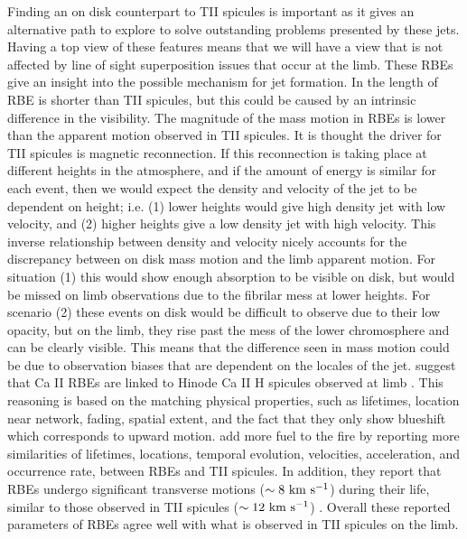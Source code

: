 Finding an on disk counterpart to TII spicules is important as it gives an alternative path to explore to solve outstanding problems presented by these jets. Having a top view of these features means that we will have a view that is not affected by line of sight superposition issues that occur at the limb. These RBEs give an insight into the possible mechanism for jet formation. In \cite{Langangen2008ApJ} the length of RBE is shorter than TII spicules, but this could be caused by an intrinsic difference in the visibility. The magnitude of the mass motion in RBEs is lower than the apparent motion observed in TII spicules. It is thought the driver for TII spicules is magnetic reconnection. If this reconnection is taking place at different heights in the atmosphere, and if the amount of energy is similar for each event, then we would expect the density and velocity of the jet to be dependent on height; i.e. (1) lower heights would give high density jet with low velocity, and (2) higher heights give a low density jet with high velocity. This inverse relationship between density and velocity nicely accounts for the discrepancy between on disk mass motion and the limb apparent motion. For situation (1) this would show enough absorption to be visible on disk, but would be missed on limb observations due to the fibrilar mess at lower heights. For scenario (2) these events on disk would be difficult to observe due to their low opacity, but on the limb, they rise past the mess of the lower chromosphere and can be clearly visible. This means that the difference seen in mass motion could be due to observation biases that are dependent on the locales of the jet. \cite{Langangen2008ApJ} suggest that Ca II RBEs are linked to Hinode Ca II H spicules observed at limb \cite{Pontieu2007PASJ}. This reasoning is based on the matching physical properties, such as lifetimes, location near network, fading, spatial extent, and the fact that they only show blueshift which corresponds to upward motion. \cite{Rouppe2009ApJ} add more fuel to the fire by reporting more similarities of lifetimes, locations, temporal evolution, velocities, acceleration, and occurrence rate, between RBEs and TII spicules. In addition, they report that RBEs undergo significant transverse motions ($\sim 8~\rm{km ~s^{-1}}$) during their life, similar to those observed in TII spicules ($\sim 12~\rm{km ~s^{-1}}$) \citep{De_Pontieu2007}. Overall these reported parameters of RBEs agree well with what is observed in TII spicules on the limb. \np
